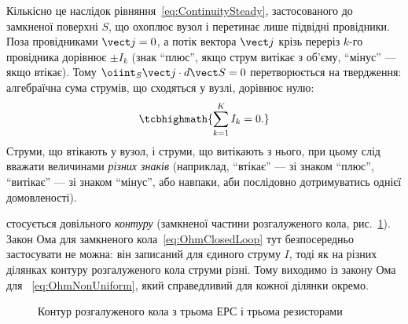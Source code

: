 Кількісно це наслідок рівняння~\eqref{eq:ContinuitySteady}, застосованого до замкненої поверхні $S$, що охоплює вузол і перетинає лише підвідні
провідники. Поза провідниками $\vect j = 0$, а потік вектора $\vect j$ крізь переріз $k$-го провідника дорівнює $\pm I_k$ (знак \enquote{плюс}, якщо
струм витікає з об'єму, \enquote{мінус} --- якщо втікає). Тому $\oiint_S \vect j\cdot d\vect S = 0$ перетворюється на твердження: алгебраїчна сума
струмів, що сходяться у вузлі, дорівнює нулю:
\begin{equation}\label{eq:Kirchhoff1}
	\tcbhighmath{
		\sum\limits_{k=1}^K I_k = 0.
	}
\end{equation}
Струми, що втікають у вузол, і струми, що витікають з нього, при цьому слід вважати величинами \emph{різних знаків} (наприклад, \enquote{втікає} --- зі
знаком \enquote{плюс}, \enquote{витікає} --- зі знаком \enquote{мінус}, або навпаки, аби послідовно дотримуватись однієї домовленості).


 стосується довільного \emph{контуру} (замкненої частини розгалуженого кола, рис.~\ref{pic:Loop}). Закон Ома для
замкненого кола~\eqref{eq:OhmClosedLoop} тут безпосередньо застосувати не можна: він записаний для єдиного струму $I$, тоді як на різних ділянках
контуру розгалуженого кола струми різні. Тому виходимо із закону Ома для ~\eqref{eq:OhmNonUniform}, який справедливий
для кожної ділянки окремо.

\begin{figure}\centering
	\caption{Контур розгалуженого кола з трьома ЕРС і трьома резисторами\label{pic:Loop}}
\end{figure}

